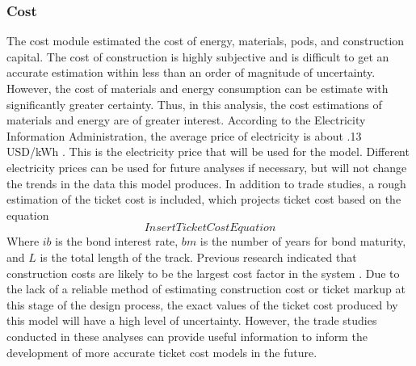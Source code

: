 \subsubsection{Cost}
	The cost module estimated the cost of energy, materials, pods, and construction capital. The cost of construction is highly subjective and is difficult to get an accurate estimation within less than an order of magnitude of uncertainty. However, the cost of materials and energy consumption can be estimate with significantly greater certainty. Thus, in this analysis, the cost estimations of materials and energy are of greater interest. According to the Electricity Information Administration, the average price of electricity is about .13 USD/kWh \cite{EIA}. This is the electricity price that will be used for the model. Different electricity prices can be used for future analyses if necessary, but will not change the trends in the data this model produces. In addition to trade studies, a rough estimation of the ticket cost is included, which projects ticket cost based on the equation
	\begin{equation}
		\label{eq:ticket_cost}
		Insert Ticket Cost Equation
	\end{equation}
	Where $ib$ is the bond interest rate, $bm$ is the number of years for bond maturity, and $L$ is the total length of the track. Previous research indicated that construction costs are likely to be the largest cost factor in the system \cite{Musk}. Due to the lack of a reliable method of estimating construction cost or ticket markup at this stage of the design process, the exact values of the ticket cost produced by this model will have a high level of uncertainty. However, the trade studies conducted in these analyses can provide useful information to inform the development of more accurate ticket cost models in the future.
